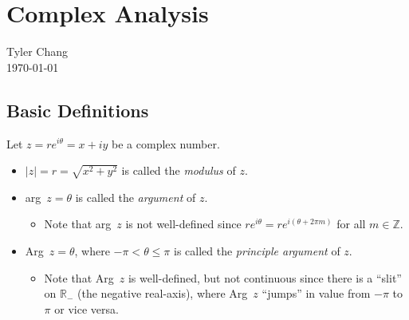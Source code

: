 \documentclass[12pt]{article}
\begin{document}
\section*{Complex Analysis}
Tyler Chang\\
\today

\subsection*{Basic Definitions}

Let $z = re^{i\theta} = x + iy$ be a complex number.
\begin{itemize}
	\item $|z|=r=\sqrt{x^2+y^2}$ is called the {\it modulus} of $z$.
	\item arg~$z=\theta$ is called the {\it argument} of $z$.
		\begin{itemize}
			\item Note that arg~$z$ is not well-defined
				since $re^{i\theta}=re^{i(\theta+2\pi m)}$
				for all $m\in\mathbb{Z}$.
		\end{itemize}
	\item Arg~$z=\theta$, where $-\pi < \theta \leq \pi$ is called
		the {\it principle argument} of $z$.
		\begin{itemize}
			\item Note that Arg~$z$ is well-defined, but not
				continuous since there is a ``slit'' on
				$\mathbb{R}_-$ (the negative real-axis),
				where Arg~$z$ ``jumps'' in value from
				$-\pi$ to $\pi$ or vice versa.
		\end{itemize}
\end{itemize}
\end{document}
